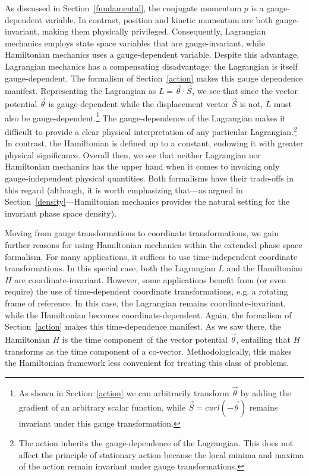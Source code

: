 \documentclass[letterpaper]{article}
\renewcommand{\vector}[1]{\ensuremath{\vec{#1}}} %
\begin{document}

As discussed in Section~\ref{fundamental}, the conjugate momentum $p$ is a gauge-dependent variable. In contrast, position and kinetic momentum are both gauge-invariant, making them physically privileged. Consequently, Lagrangian mechanics employs state space variables that are gauge-invariant, while Hamiltonian mechanics uses a gauge-dependent variable. Despite this advantage, Lagrangian mechanics has a compensating disadvantage: the Lagrangian is itself gauge-dependent. The formalism of Section~\ref{action} makes this gauge dependence manifest. Representing the Lagrangian as $L =\vector{\theta} \cdot \vector{S} $, we see that since the vector potential $\vector{\theta}$ is gauge-dependent while the displacement vector $\vector{S}$ is not, $L$ must also be gauge-dependent.\footnote{As shown in Section~\ref{action} we can arbitrarily transform $\vector{\theta}$ by adding the gradient of an arbitrary scalar function, while $\vector{S}=curl(-\vector{\theta}) $ remains invariant under this gauge transformation.} The gauge-dependence of the Lagrangian makes it difficult to provide a clear physical interpretation of any particular Lagrangian.\footnote{The action inherits the gauge-dependence of the Lagrangian. This does not affect the principle of stationary action because the local minima and maxima of the action remain invariant under gauge transformations.} In contrast, the Hamiltonian is defined up to a constant, endowing it with greater physical significance. Overall then, we see that neither Lagrangian nor Hamiltonian mechanics has the upper hand when it comes to invoking only gauge-independent physical quantities. Both formalisms have their trade-offs in this regard (although, it is worth emphasizing that---as argued in Section~\ref{density}---Hamiltonian mechanics provides the natural setting for the invariant phase space density).

Moving from gauge transformations to coordinate transformations, we gain further reasons for using Hamiltonian mechanics within the extended phase space formalism. For many applications, it suffices to use time-independent coordinate transformations. In this special case, both the Lagrangian $L$ and the Hamiltonian $H$ are coordinate-invariant. However, some applications benefit from (or even require) the use of time-dependent coordinate transformations, e.g. a rotating frame of reference. In this case, the Lagrangian remains coordinate-invariant, while the Hamiltonian becomes coordinate-dependent. Again, the formalism of Section~\ref{action} makes this time-dependence manifest. As we saw there, the Hamiltonian $H$ is the time component of the vector potential $\vector{\theta} $, entailing that $H$ transforms as the time component of a co-vector. Methodologically, this makes the Hamiltonian framework less convenient for treating this class of problems.
\end{document}
